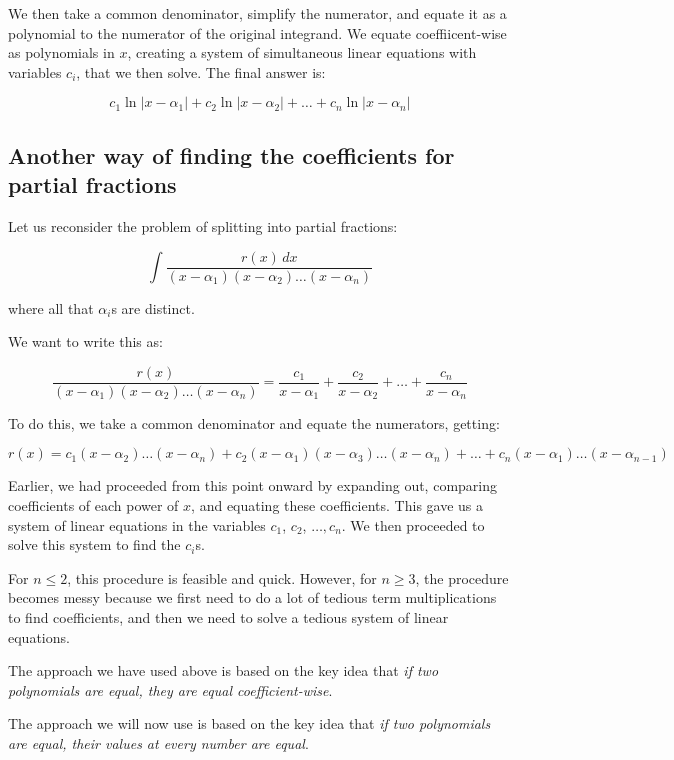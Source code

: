 \documentclass[10pt]{amsart}
\begin{document}
We then take a common denominator, simplify the numerator, and equate
it as a polynomial to the numerator of the original integrand. We
equate coeffiicent-wise as polynomials in $x$, creating a system of
simultaneous linear equations with variables $c_i$, that we then
solve. The final answer is:

$$c_1 \ln|x - \alpha_1| + c_2 \ln|x - \alpha_2| + \dots + c_n\ln |x - \alpha_n|$$

\subsection{Another way of finding the coefficients for partial fractions}

Let us reconsider the problem of splitting into partial fractions:

$$\int \frac{r(x) \, dx}{(x - \alpha_1)(x - \alpha_2) \dots (x - \alpha_n)}$$

where all that $\alpha_i$s are distinct.

We want to write this as:

$$\frac{r(x)}{(x - \alpha_1)(x - \alpha_2) \dots (x - \alpha_n)} = \frac{c_1}{x - \alpha_1} + \frac{c_2}{x - \alpha_2} + \dots + \frac{c_n}{x - \alpha_n}$$

To do this, we take a common denominator and equate the numerators, getting:

$$r(x) = c_1(x - \alpha_2) \dots (x - \alpha_n) + c_2(x - \alpha_1)(x - \alpha_3) \dots (x - \alpha_n) + \dots + c_n(x - \alpha_1) \dots (x - \alpha_{n-1})$$

Earlier, we had proceeded from this point onward by expanding out,
comparing coefficients of each power of $x$, and equating these
coefficients. This gave us a system of linear equations in the
variables $c_1$, $c_2$, $\dots, c_n$. We then proceeded to solve this
system to find the $c_i$s.

For $n \le 2$, this procedure is feasible and quick. However, for $n
\ge 3$, the procedure becomes messy because we first need to do a lot
of tedious term multiplications to find coefficients, and then we need
to solve a tedious system of linear equations.

The approach we have used above is based on the key idea that {\em if
two polynomials are equal, they are equal coefficient-wise}.

The approach we will now use is based on the key idea that {\em if two
polynomials are equal, their values at every number are equal}.
\end{document}
